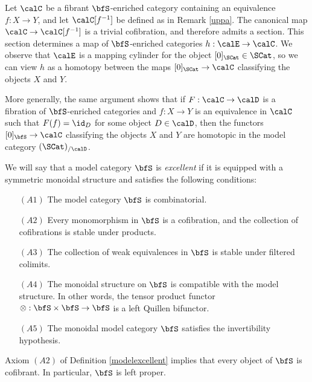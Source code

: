 \begin{remark}\label{cuddle}
Let $\calC$ be a fibrant $\bfS$-enriched category containing an equivalence
$f: X \rightarrow Y$, and let $\calC[ f^{-1} ]$ be defined as in Remark \ref{uppa}. 
The canonical map $\calC \rightarrow \calC[f^{-1}]$ is a trivial cofibration, and
therefore admits a section. This section determines a map of $\bfS$-enriched
categories $h: \calE \rightarrow \calC$. We observe that $\calE$ is a mapping
cylinder for the object $[0]_{\SCat} \in \SCat$, so we can view
$h$ as a homotopy between the maps $[0]_{\SCat} \rightarrow \calC$
classifying the objects $X$ and $Y$.

More generally, the same argument shows that if $F: \calC \rightarrow \calD$
is a fibration of $\bfS$-enriched categories and $f: X \rightarrow Y$ is an equivalence
in $\calC$ such that $F(f) = \id_{D}$ for some object $D \in \calD$, then
the functors $[0]_{\bfS} \rightarrow \calC$ classifying the objects $X$ and $Y$
are homotopic in the model category $( \SCat)_{/ \calD}$. 
\end{remark}

\begin{definition}\label{modelexcellent}
We will say that a model category $\bfS$ is {\it excellent} if it is equipped with a symmetric
monoidal structure and satisfies the following conditions:
\begin{itemize}
\item[$(A1)$] The model category $\bfS$ is combinatorial.
\item[$(A2)$] Every monomorphism in $\bfS$ is a cofibration, and the collection of cofibrations
is stable under products.
\item[$(A3)$] The collection of weak equivalences in $\bfS$ is stable under filtered colimits.
\item[$(A4)$] The monoidal structure on $\bfS$ is compatible with the model structure.
In other words, the tensor product functor $\otimes: \bfS \times \bfS \rightarrow \bfS$ is a left Quillen bifunctor.
\item[$(A5)$] The monoidal model category $\bfS$ satisfies the invertibility hypothesis.
\end{itemize}
\end{definition}

\begin{remark}\label{dummu}
Axiom $(A2)$ of Definition \ref{modelexcellent} implies that every object of $\bfS$ is cofibrant.
In particular, $\bfS$ is left proper.
\end{remark}

